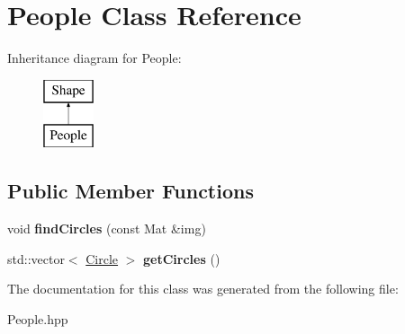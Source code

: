 \hypertarget{class_people}{}\section{People Class Reference}
\label{class_people}
Inheritance diagram for People\+:\begin{figure}[H]
\begin{center}
\leavevmode
\includegraphics[height=2.000000cm]{class_people}
\end{center}
\end{figure}
\subsection*{Public Member Functions}
\begin{DoxyCompactItemize}
\item 
\mbox{\label{class_people_a4c13aebe88654dba21a2a12b8b5943f7}} 
void {\bfseries find\+Circles} (const Mat \&img)
\item 
\mbox{\label{class_people_a0fc4e671ff110314dc0dc65ee150f04c}} 
std\+::vector$<$ \mbox{\hyperlink{class_circle}{Circle}} $>$ {\bfseries get\+Circles} ()
\end{DoxyCompactItemize}


The documentation for this class was generated from the following file\+:\begin{DoxyCompactItemize}
\item 
People.\+hpp\end{DoxyCompactItemize}
